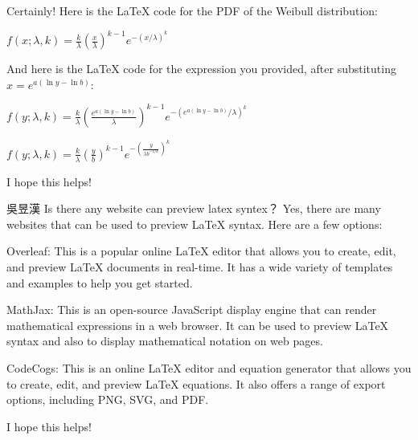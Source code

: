 Certainly! Here is the LaTeX code for the PDF of the Weibull distribution:

$f(x; \lambda, k) = \frac{k}{\lambda} \left(\frac{x}{\lambda}\right)^{k-1} e^{-(x/\lambda)^k}$

And here is the LaTeX code for the expression you provided, after substituting $x = e^{a(\ln y - \ln b)}$:

$f(y; \lambda, k) = \frac{k}{\lambda} \left(\frac{e^{a(\ln y - \ln b)}}{\lambda}\right)^{k-1} e^{-(e^{a(\ln y - \ln b)}/\lambda)^k}$

$f(y; \lambda, k) = \frac{k}{\lambda} \left(\frac{y}{b}\right)^{k-1} e^{-\left(\frac{y}{\lambda b^{-1/k}}\right)^k}$

I hope this helps!




吳昱漢
Is there any website can preview latex syntex？
Yes, there are many websites that can be used to preview LaTeX syntax. Here are a few options:

Overleaf: This is a popular online LaTeX editor that allows you to create, edit, and preview LaTeX documents in real-time. It has a wide variety of templates and examples to help you get started.

MathJax: This is an open-source JavaScript display engine that can render mathematical expressions in a web browser. It can be used to preview LaTeX syntax and also to display mathematical notation on web pages.

CodeCogs: This is an online LaTeX editor and equation generator that allows you to create, edit, and preview LaTeX equations. It also offers a range of export options, including PNG, SVG, and PDF.

I hope this helps!





